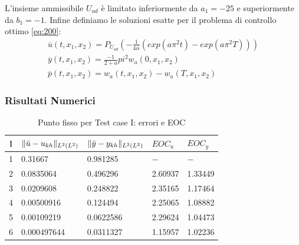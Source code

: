 L'insieme ammissibile $U_{ad}$ è limitato inferiormente da $a_1=-25$ e superiormente da $b_1=-1$.
Infine definiamo le soluzioni esatte per il problema di controllo ottimo \ref{eq:200}:
{\renewcommand\arraystretch{2}
\begin{equation}
\begin{array}{c}
\overline{u}(t,x_1,x_2) = P_{U_{ad}} \left( -\frac{1}{4\alpha}(exp(a{\pi}^2t)-exp(a{\pi}^2T)) \right) \\
\overline{y}(t,x_1,x_2) = \frac{- 1}{2 + a}{pi}^2w_a(0,x_1,x_2) \\
\overline{p}(t,x_1,x_2) = w_a(t,x_1,x_2) - w_a(T,x_1,x_2)
\end{array}
\label{eq:504}
\end{equation}
}

\subsubsection{Risultati Numerici}

\begin{table}
\caption{Punto fisso per Test case I: errori e EOC }
\label{puntofissoI}
\centering

\begin{tabular}{cllll}
\toprule
{l}           &  {$ \lVert\bar{u}-u_{kh}\rVert_{L^2(L^2)} $} &  {$ \lVert\bar{y}-y_{kh}\rVert_{L^2(L^2)} $} &  {$ EOC_u $} &  {$ EOC_y $} \\
\midrule
1            &  0.31667 &  0.981285 &  {$-$} &  {$-$} \\
2            &  0.0835064 &  0.496296 &  2.60937 &  1.33449 \\
3            &  0.0209608 &  0.248822 &  2.35165 &  1.17464 \\
4            &  0.00500916 &  0.124494 &  2.25065 &  1.08882 \\
5            &  0.00109219  &  0.0622586 &  2.29624 &  1.04473 \\
6            &  0.000497644 &  0.0311327 &  1.15957 &  1.02236 \\
\bottomrule
\end{tabular}              

\end{table}


